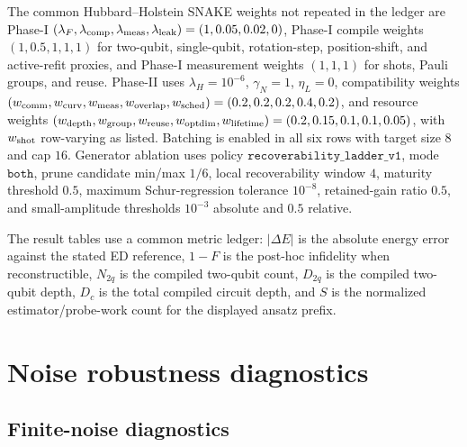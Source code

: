 \documentclass[
  reprint,
  amsmath,
  amssymb,
  aps,
  pra,
  nofootinbib,
  superscriptaddress,
  floatfix
]{revtex4-2}
\begin{document}
The common Hubbard--Holstein SNAKE weights not repeated in the ledger are Phase-I \((\lambda_F,\lambda_{\rm comp},\lambda_{\rm meas},\lambda_{\rm leak})=(1,0.05,0.02,0)\), Phase-I compile weights \((1,0.5,1,1,1)\) for two-qubit, single-qubit, rotation-step, position-shift, and active-refit proxies, and Phase-I measurement weights \((1,1,1)\) for shots, Pauli groups, and reuse. Phase-II uses \(\lambda_H=10^{-6}\), \(\gamma_N=1\), \(\eta_L=0\), compatibility weights \((w_{\rm comm},w_{\rm curv},w_{\rm meas},w_{\rm overlap},w_{\rm sched})=(0.2,0.2,0.2,0.4,0.2)\), and resource weights \((w_{\rm depth},w_{\rm group},w_{\rm reuse},w_{\rm optdim},w_{\rm lifetime})=(0.2,0.15,0.1,0.1,0.05)\), with \(w_{\rm shot}\) row-varying as listed. Batching is enabled in all six rows with target size \(8\) and cap \(16\). Generator ablation uses policy \(\texttt{recoverability\_ladder\_v1}\), mode \(\texttt{both}\), prune candidate min/max \(1/6\), local recoverability window \(4\), maturity threshold \(0.5\), maximum Schur-regression tolerance \(10^{-8}\), retained-gain ratio \(0.5\), and small-amplitude thresholds \(10^{-3}\) absolute and \(0.5\) relative.

The result tables use a common metric ledger: \(|\Delta E|\) is the absolute
energy error against the stated ED reference, \(1-F\) is the post-hoc
infidelity when reconstructible, \(N_{2q}\) is the compiled two-qubit count,
\(D_{2q}\) is the compiled two-qubit depth, \(D_c\) is the total compiled
circuit depth, and \(S\) is the normalized estimator/probe-work count for the
displayed ansatz prefix.

\section{Noise robustness diagnostics}
\label{app:noise_selection_robustness}
\label{app:finite_shot_score_robustness}

\subsection{Finite-noise diagnostics}
\end{document}
